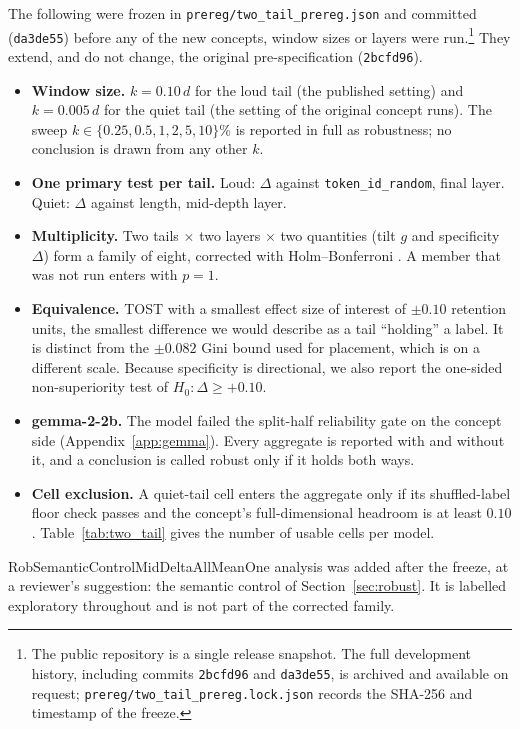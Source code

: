 \documentclass[11pt]{report}
\newcommand{\ifsemantic}[1]{\ifcsname RobSemanticControlMidDeltaAllMean\endcsname #1\fi}
\newcommand{\prerevcommit}{\texttt{2bcfd96}}
\newcommand{\revcommit}{\texttt{da3de55}} %
\begin{document}
The following were frozen in \texttt{prereg/two\_tail\_prereg.json} and
committed (\revcommit) before any of the new concepts, window sizes or layers
were run.\footnote{The public repository is a single release snapshot. The full
development history, including commits \prerevcommit{} and \revcommit{}, is
archived and available on request; \texttt{prereg/two\_tail\_prereg.lock.json}
records the SHA-256 and timestamp of the freeze.} They extend, and do not change, the original pre-specification
(\prerevcommit).
\begin{itemize}
  \item \textbf{Window size.} $k=0.10\,d$ for the loud tail (the published
        setting) and $k=0.005\,d$ for the quiet tail (the setting of the original
        concept runs). The sweep $k \in \{0.25, 0.5, 1, 2, 5, 10\}\%$ is
        reported in full as robustness; no conclusion is drawn from any other
        $k$.
  \item \textbf{One primary test per tail.} Loud: $\Delta$ against
        \texttt{token\_id\_random}, final layer. Quiet: $\Delta$ against length,
        mid-depth layer.
  \item \textbf{Multiplicity.} Two tails $\times$ two layers $\times$ two
        quantities (tilt $g$ and specificity $\Delta$) form a family of eight,
        corrected with Holm--Bonferroni \citep{holm1979simple}. A member that
        was not run enters with $p=1$.
  \item \textbf{Equivalence.} TOST \citep{lakens2017equivalence} with a
        smallest effect size of interest of $\pm0.10$ retention units, the
        smallest difference we would describe as a tail ``holding'' a label. It
        is distinct from the $\pm0.082$ Gini bound used for placement, which is
        on a different scale. Because specificity is directional, we also report
        the one-sided non-superiority test of $H_0: \Delta \ge +0.10$.
  \item \textbf{gemma-2-2b.} The model failed the split-half reliability gate on
        the concept side (Appendix~\ref{app:gemma}). Every aggregate is
        reported with and without it, and a conclusion is called robust only if
        it holds both ways.
  \item \textbf{Cell exclusion.} A quiet-tail cell enters the aggregate only if
        its shuffled-label floor check passes and the concept's full-dimensional
        headroom is at least $0.10$. Table~\ref{tab:two_tail} gives the number
        of usable cells per model.
\end{itemize}
\ifsemantic{One analysis was added after the freeze, at a reviewer's suggestion:
the semantic control of Section~\ref{sec:robust}. It is labelled exploratory
throughout and is not part of the corrected family.}
\end{document}
